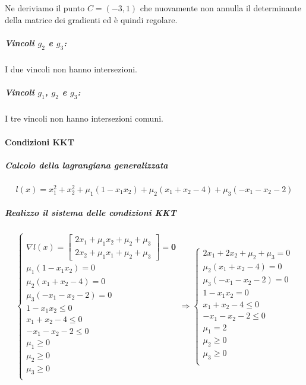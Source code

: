 \documentclass[\main/main.tex]{subfiles}
\begin{document}
Ne deriviamo il punto $C = (-3, 1)$ che nuovamente non annulla il determinante della matrice dei gradienti ed è quindi regolare.

\subparagraph*{Vincoli $g_2$ e $g_3$:}
I due vincoli non hanno intersezioni.

\subparagraph*{Vincoli $g_1$, $g_2$ e $g_3$:}
I tre vincoli non hanno intersezioni comuni.

\paragraph*{Condizioni KKT}
\subparagraph*{Calcolo della lagrangiana generalizzata}

\[
  l(x) = x^2_1+x^2_2 + \mu_1 (1-x_1x_2) + \mu_2 (x_1 + x_2 -4) + \mu_3 (-x_1 - x_2 - 2)
\]

\subparagraph*{Realizzo il sistema delle condizioni KKT}

\[
  \begin{cases}
    \nabla l(x) = \begin{bmatrix}
      2x_1 + \mu_1x_2 + \mu_2 + \mu_3 \\
      2x_2 + \mu_1x_1 + \mu_2 + \mu_3
    \end{bmatrix} = \bm{0} \\
    \mu_1 (1-x_1x_2) = 0                              \\
    \mu_2 (x_1 + x_2 -4) = 0                          \\
    \mu_3 (-x_1 - x_2 - 2) = 0                        \\
    1-x_1x_2 \leq 0                                   \\
    x_1 + x_2 -4 \leq 0                               \\
    -x_1 - x_2 - 2 \leq 0                             \\
    \mu_1 \geq 0                                      \\
    \mu_2 \geq 0                                      \\
    \mu_3 \geq 0                                      \\
  \end{cases}
  \Rightarrow
  \begin{cases}
    2x_1 + 2x_2 + \mu_2 + \mu_3 = 0 \\
    \mu_2 (x_1 + x_2 -4) = 0        \\
    \mu_3 (-x_1 - x_2 - 2) = 0      \\
    1-x_1x_2 = 0                    \\
    x_1 + x_2 -4 \leq 0             \\
    -x_1 - x_2 - 2 \leq 0           \\
    \mu_1 = 2                       \\
    \mu_2 \geq 0                    \\
    \mu_3 \geq 0                    \\
  \end{cases}
\]
\end{document}
